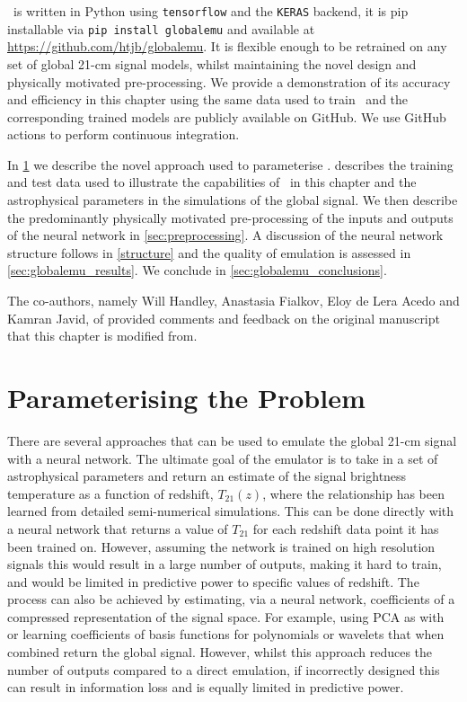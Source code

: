 \name~is written in Python using \texttt{tensorflow} and the \texttt{KERAS} backend, it is pip installable via \texttt{pip install globalemu} and available at \url{https://github.com/htjb/globalemu}. It is flexible enough to be retrained on any set of global 21-cm signal models, whilst maintaining the novel design and physically motivated pre-processing. We provide a demonstration of its accuracy and efficiency in this chapter using the same data used to train \cmGEM~and the corresponding trained models are publicly available on GitHub. We use GitHub actions to perform continuous integration.

In \cref{sec:parameterisation_globalemu} we describe the novel approach used to parameterise \name.  describes the training and test data used to illustrate the capabilities of \name~in this chapter and the astrophysical parameters in the simulations of the global signal. We then describe the predominantly physically motivated pre-processing of the inputs and outputs of the neural network in \cref{sec:preprocessing}. A discussion of the neural network structure follows in \cref{structure} and the quality of emulation is assessed in \cref{sec:globalemu_results}. We conclude in \cref{sec:globalemu_conclusions}.

The co-authors, namely Will Handley, Anastasia Fialkov, Eloy de Lera Acedo and Kamran Javid, of \cite{Bevins_globalemu_2021} provided comments and feedback on the original manuscript that this chapter is modified from.

\section{Parameterising the Problem}
\label{sec:parameterisation_globalemu}

There are several approaches that can be used to emulate the global 21-cm signal with a neural network. The ultimate goal of the emulator is to take in a set of astrophysical parameters and return an estimate of the signal brightness temperature as a function of redshift, $T_{21}(z)$, where the relationship has been learned from detailed semi-numerical simulations. This can be done directly with a neural network that returns a value of $T_{21}$ for each redshift data point it has been trained on. However, assuming the network is trained on high resolution signals this would result in a large number of outputs, making it hard to train, and would be limited in predictive power to specific values of redshift. The process can also be achieved by estimating, via a neural network, coefficients of a compressed representation of the signal space. For example, using PCA as with \cmGEM~\citep{Cohen2020} or learning coefficients of basis functions for polynomials or wavelets that when combined return the global signal. However, whilst this approach reduces the number of outputs compared to a direct emulation, if incorrectly designed this can result in information loss and is equally limited in predictive power.

